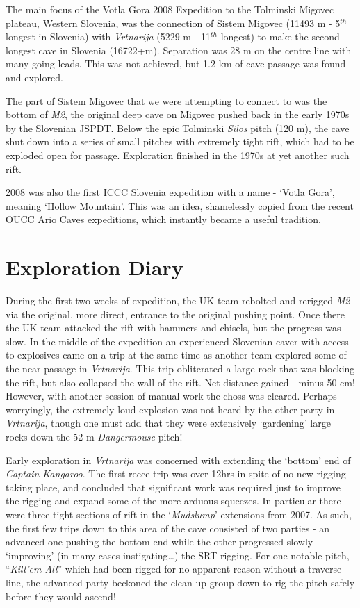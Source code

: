 The main focus of the Votla Gora 2008 Expedition to the Tolminski
Migovec plateau, Western Slovenia, was the connection of Sistem Migovec
(11493 m - 5\(^{th}\) longest in Slovenia) with \emph{Vrtnarija} (5229 m
- 11\(^{th}\) longest) to make the second longest cave in Slovenia
(16722+m). Separation was 28 m on the centre line with many going leads.
This was not achieved, but 1.2 km of cave passage was found and
explored.

The part of Sistem Migovec that we were attempting to connect to was the
bottom of \emph{M2}, the original deep cave on Migovec pushed back in
the early 1970s by the Slovenian JSPDT. Below the epic Tolminski
\emph{Silos} pitch (120 m), the cave shut down into a series of small
pitches with extremely tight rift, which had to be exploded open for
passage. Exploration finished in the 1970s at yet another such rift.

2008 was also the first ICCC Slovenia expedition with a name - `Votla
Gora', meaning `Hollow Mountain'. This was an idea, shamelessly copied
from the recent OUCC Ario Caves expeditions, which instantly became a
useful tradition.

\hypertarget{exploration-diary}{%
\section{Exploration Diary}\label{exploration-diary}}

During the first two weeks of expedition, the UK team rebolted and
rerigged \emph{M2} via the original, more direct, entrance to the
original pushing point. Once there the UK team attacked the rift with
hammers and chisels, but the progress was slow. In the middle of the
expedition an experienced Slovenian caver with access to explosives came
on a trip at the same time as another team explored some of the near
passage in \emph{Vrtnarija}. This trip obliterated a large rock that was
blocking the rift, but also collapsed the wall of the rift. Net distance
gained - minus 50 cm! However, with another session of manual work the
choss was cleared. Perhaps worryingly, the extremely loud explosion was
not heard by the other party in \emph{Vrtnarija}, though one must add
that they were extensively `gardening' large rocks down the 52 m
\emph{Dangermouse} pitch!

Early exploration in \emph{Vrtnarija} was concerned with extending the
`bottom' end of \emph{Captain Kangaroo}. The first recce trip was over
12hrs in spite of no new rigging taking place, and concluded that
significant work was required just to improve the rigging and expand
some of the more arduous squeezes. In particular there were three tight
sections of rift in the `\emph{Mudslump}' extensions from 2007. As such,
the first few trips down to this area of the cave consisted of two
parties - an advanced one pushing the bottom end while the other
progressed slowly `improving' (in many cases instigating\ldots{}) the
SRT rigging. For one notable pitch, ``\emph{Kill'em All}'' which had
been rigged for no apparent reason without a traverse line, the advanced
party beckoned the clean-up group down to rig the pitch safely before
they would ascend!

